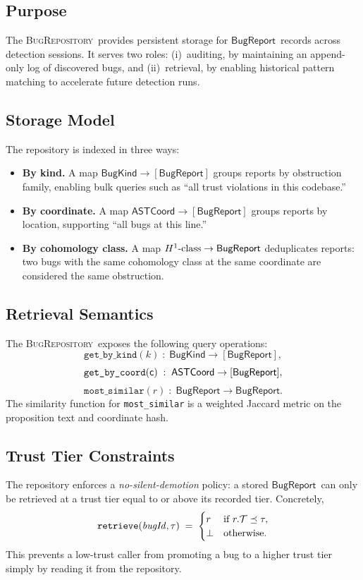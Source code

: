 \documentclass[11pt]{article}
\newcommand{\BugKind}{\ensuremath{\mathsf{BugKind}}}          %
\newcommand{\BugRep}{\ensuremath{\mathsf{BugReport}}}          %
\newcommand{\BugRepo}{\textsc{BugRepository}}     %
\newcommand{\ASTCoord}{\ensuremath{\mathsf{ASTCoord}}}         %
\begin{document}
\subsection{Purpose}

The \BugRepo\ provides persistent storage for \BugRep\ records across
detection sessions.  It serves two roles: (i)~auditing, by maintaining
an append-only log of discovered bugs, and (ii)~retrieval, by enabling
historical pattern matching to accelerate future detection runs.

\subsection{Storage Model}

The repository is indexed in three ways:
\begin{itemize}[leftmargin=2em,topsep=2pt]
  \item \textbf{By kind.}  A map $\BugKind \to [\BugRep]$ groups
    reports by obstruction family, enabling bulk queries such as
    ``all trust violations in this codebase.''
  \item \textbf{By coordinate.}  A map $\ASTCoord \to [\BugRep]$
    groups reports by location, supporting ``all bugs at this line.''
  \item \textbf{By cohomology class.}  A map
    $\Hcoh{1}\text{-class} \to \BugRep$ deduplicates reports: two
    bugs with the same cohomology class at the same coordinate are
    considered the same obstruction.
\end{itemize}

\subsection{Retrieval Semantics}

The \BugRepo\ exposes the following query operations:
\[
  \texttt{get\_by\_kind}(k)
    \;:\; \BugKind \to [\BugRep],
\]
\[
  \texttt{get\_by\_coord}(\coord)
    \;:\; \ASTCoord \to [\BugRep],
\]
\[
  \texttt{most\_similar}(r)
    \;:\; \BugRep \to \BugRep.
\]
The similarity function for \texttt{most\_similar} is a weighted
Jaccard metric on the proposition text and coordinate hash.

\subsection{Trust Tier Constraints}

The repository enforces a \emph{no-silent-demotion} policy: a stored
\BugRep\ can only be retrieved at a trust tier equal to or above its
recorded tier.  Concretely,
\[
  \texttt{retrieve}(\mathit{bugId}, \tau)
    \;=\; \begin{cases}
      r & \text{if } r.\mathcal{T} \preceq \tau,\\
      \bot & \text{otherwise.}
    \end{cases}
\]
This prevents a low-trust caller from promoting a bug to a higher trust
tier simply by reading it from the repository.
\end{document}
